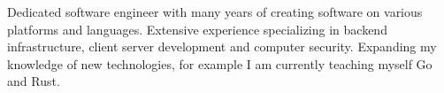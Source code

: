 \begin{cvparagraph}

Dedicated software engineer with many years of creating software on various platforms and languages. Extensive experience specializing in backend infrastructure, client server development and computer security. Expanding my knowledge of new technologies, for example I am currently teaching myself Go and Rust.
\end{cvparagraph}
